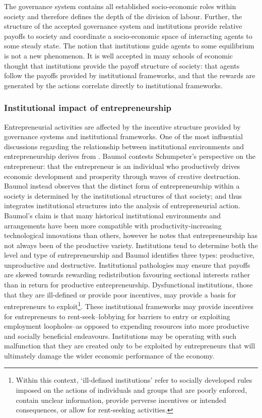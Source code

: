 The governance system contains all established socio-economic roles within society and therefore defines the depth of the division of labour. Further, the structure of the accepted governance system and institutions provide relative payoffs to society and coordinate a socio-economic space of interacting agents to some steady state. The notion that institutions guide agents to some equilibrium is not a new phenomenon. It is well accepted in many schools of economic thought that institutions provide the payoff structure of society: that agents follow the payoffs provided by institutional frameworks, and that the rewards are generated by the actions correlate directly to institutional frameworks.

\subsubsection{Institutional impact of entrepreneurship}


Entrepreneurial activities are affected by the incentive structure provided by governance systems and institutional frameworks. One of the most influential discussions regarding the relationship between institutional environments and entrepreneurship derives from \citet{Baumol1990}. Baumol contests Schumpeter's perspective on the entrepreneur: that the entrepreneur is an individual who productively drives economic development and prosperity through waves of creative destruction. Baumol instead observes that the distinct form of entrepreneurship within a society is determined by the institutional structures of that society; and thus integrates institutional structures into the analysis of entrepreneurial action. Baumol's claim is that many historical institutional environments and arrangements have been more compatible with productivity-increasing technological innovations than others, however he notes that entrepreneurship has not always been of the productive variety. Institutions tend to determine both the level and type of entrepreneurship and Baumol identifies three types: productive, unproductive and destructive. Institutional pathologies may ensure that payoffs are skewed towards rewarding redistribution favouring sectional interests rather than in return for productive entrepreneurship. Dysfunctional institutions, those that they are ill-defined or provide poor incentives, may provide a basis for entrepreneurs to exploit\footnote{Within this context, `ill-defined institutions' refer to socially developed rules imposed on the actions of individuals and groups that are poorly enforced, contain unclear information, provide perverse incentives or intended consequences, or allow for rent-seeking activities.}. These institutional frameworks may provide incentives for entrepreneurs to rent-seek--lobbying for barriers to entry or exploiting employment loopholes--as opposed to expending resources into more productive and socially beneficial endeavours. Institutions may be operating with such malfunction that they are created only to be exploited by entrepreneurs that will ultimately damage the wider economic performance of the economy.

